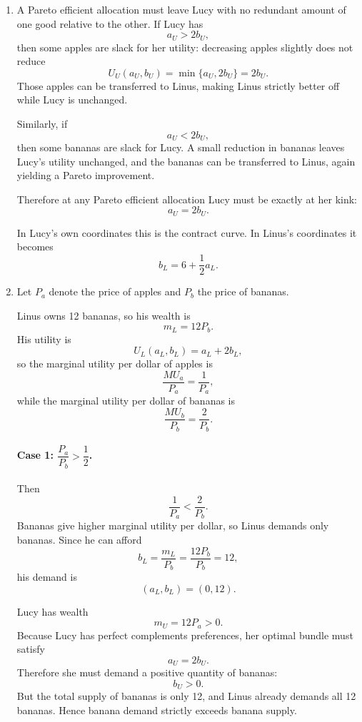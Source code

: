\documentclass[12pt]{article}
\begin{document}
\begin{enumerate}[label=(\alph*)]
\begin{center}
\end{center}

    \item
    A Pareto efficient allocation must leave Lucy with no redundant amount of one good relative to the other. If Lucy has
    \[
    a_U>2b_U,
    \]
    then some apples are slack for her utility: decreasing apples slightly does not reduce
    \[
    U_U(a_U,b_U)=\min\{a_U,2b_U\}=2b_U.
    \]
    Those apples can be transferred to Linus, making Linus strictly better off while Lucy is unchanged.

    Similarly, if
    \[
    a_U<2b_U,
    \]
    then some bananas are slack for Lucy. A small reduction in bananas leaves Lucy's utility unchanged, and the bananas can be transferred to Linus, again yielding a Pareto improvement.

    Therefore at any Pareto efficient allocation Lucy must be exactly at her kink:
    \[
    \boxed{a_U=2b_U.}
    \]

    In Lucy's own coordinates this is the contract curve. In Linus's coordinates it becomes
    \[
    \boxed{b_L=6+\frac12 a_L.}
    \]

\newpage
    \item
    Let \(P_a\) denote the price of apples and \(P_b\) the price of bananas.

    Linus owns 12 bananas, so his wealth is
    \[
    m_L=12P_b.
    \]
    His utility is
    \[
    U_L(a_L,b_L)=a_L+2b_L,
    \]
    so the marginal utility per dollar of apples is
    \[
    \frac{MU_a}{P_a}=\frac{1}{P_a},
    \]
    while the marginal utility per dollar of bananas is
    \[
    \frac{MU_b}{P_b}=\frac{2}{P_b}.
    \]

    \paragraph{Case 1: \(\dfrac{P_a}{P_b}>\dfrac12\).}
    Then
    \[
    \frac{1}{P_a}<\frac{2}{P_b}.
    \]
    Bananas give higher marginal utility per dollar, so Linus demands only bananas. Since he can afford
    \[
    b_L=\frac{m_L}{P_b}=\frac{12P_b}{P_b}=12,
    \]
    his demand is
    \[
    (a_L,b_L)=(0,12).
    \]

    Lucy has wealth
    \[
    m_U=12P_a>0.
    \]
    Because Lucy has perfect complements preferences, her optimal bundle must satisfy
    \[
    a_U=2b_U.
    \]
    Therefore she must demand a positive quantity of bananas:
    \[
    b_U>0.
    \]
    But the total supply of bananas is only 12, and Linus already demands all 12 bananas. Hence banana demand strictly exceeds banana supply.


\end{enumerate}
\end{document}
